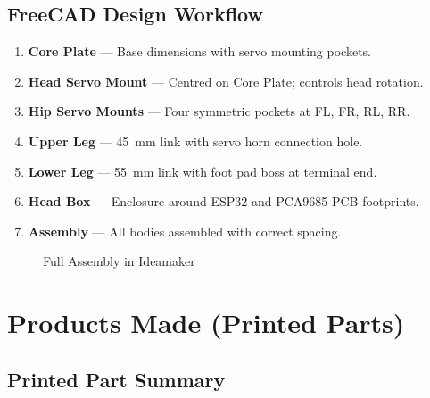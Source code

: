 \documentclass[12pt, a4paper]{article}
\begin{document}
\subsection{FreeCAD Design Workflow}

\begin{enumerate}[label=\arabic*., itemsep=4pt]
  \item \textbf{Core Plate} --- Base dimensions with servo mounting pockets.
  \item \textbf{Head Servo Mount} --- Centred on Core Plate; controls head rotation.
  \item \textbf{Hip Servo Mounts} --- Four symmetric pockets at FL, FR, RL, RR.
  \item \textbf{Upper Leg} --- 45~mm link with servo horn connection hole.
  \item \textbf{Lower Leg} --- 55~mm link with foot pad boss at terminal end.
  \item \textbf{Head Box} --- Enclosure around ESP32 and PCA9685 PCB footprints.
  \item \textbf{Assembly} --- All bodies assembled with correct spacing.
\end{enumerate}












\begin{figure}[H]
  \centering
  \vspace{10cm}
  \caption{Full Assembly in Ideamaker}
  \label{fig:cad_assembly}
\end{figure}

\section{Products Made (Printed Parts)}

\subsection{Printed Part Summary}
\end{document}
